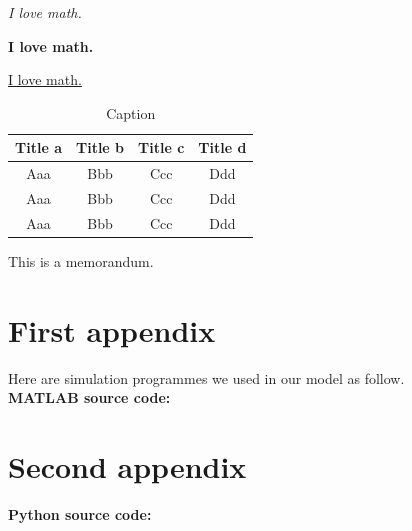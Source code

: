 \documentclass{mcmthesis}  %
\begin{document}
 \textit{I love math.}  %

\textbf{I love math.}  %

\underline{I love math.}  %

\begin{table}[!t]  %
\caption{Caption}  %
\label{tab1}  %
\tabcolsep 42pt %
\begin{tabular*}{\textwidth}{cccc}  %
\toprule  %
Title a & Title b & Title c & Title d \\
\midrule  %
Aaa & Bbb & Ccc & Ddd \\
Aaa & Bbb & Ccc & Ddd \\
Aaa & Bbb & Ccc & Ddd \\
\bottomrule  %
\end{tabular*}  %
\end{table}  %


\printbibliography  %


\begin{appendices}  %

\begin{memo}[Memorandum]  %
	This is a memorandum.
\end{memo}  %

\section{First appendix}  %

Here are simulation programmes we used in our model as follow.\\
\textbf{MATLAB source code:}
%

\section{Second appendix}  %

\textbf{Python source code:}
%

\end{appendices}  %
\end{document}
